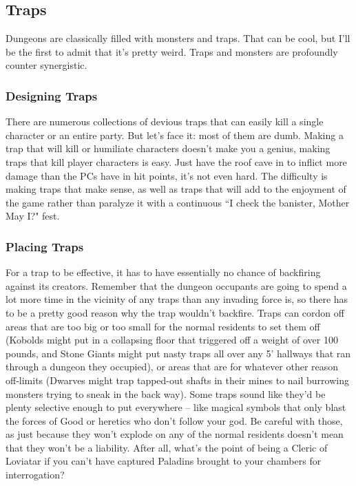 \subsection{Traps}
\vspace*{-8pt}

Dungeons are classically filled with monsters and traps. That can be cool, but I'll be the first to admit that it's pretty weird. Traps and monsters are profoundly counter synergistic.

\subsubsection{Designing Traps}

There are numerous collections of devious traps that can easily kill a single character or an entire party. But let's face it: most of them are dumb. Making a trap that will kill or humiliate characters doesn't make you a genius, making traps that kill player characters is easy. Just have the roof cave in to inflict more damage than the PCs have in hit points, it's not even hard. The difficulty is making traps that make sense, as well as traps that will add to the enjoyment of the game rather than paralyze it with a continuous ``I check the banister, Mother May I?" fest.

\subsubsection{Placing Traps}

For a trap to be effective, it has to have essentially no chance of backfiring against its creators. Remember that the dungeon occupants are going to spend a lot more time in the vicinity of any traps than any invading force is, so there has to be a pretty good reason why the trap wouldn't backfire. Traps can cordon off areas that are too big or too small for the normal residents to set them off (Kobolds might put in a collapsing floor that triggered off a weight of over 100 pounds, and Stone Giants might put nasty traps all over any 5' hallways that ran through a dungeon they occupied), or areas that are for whatever other reason off-limits (Dwarves might trap tapped-out shafts in their mines to nail burrowing monsters trying to sneak in the back way). Some traps sound like they'd be plenty selective enough to put everywhere -- like magical symbols that only blast the forces of Good or heretics who don't follow your god. Be careful with those, as just because they won't explode on any of the normal residents doesn't mean that they won't be a liability. After all, what's the point of being a Cleric of Loviatar if you can't have captured Paladins brought to your chambers for interrogation?

